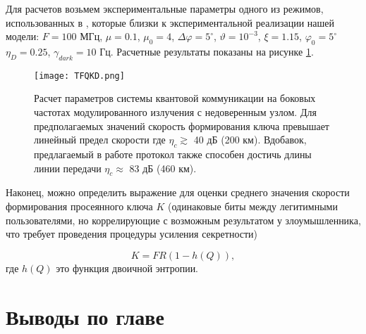 Для расчетов возьмем экспериментальные параметры одного из режимов, использованных в \cite{Gleim16,Miroshnichenko18}, которые близки к экспериментальной реализации нашей модели: $F=100$ МГц, $\mu=0.1$, $\mu_0=4$, $\Delta\varphi=5^{\circ}$, $\vartheta=10^{-3}$, $\xi=1.15$, $\varphi_0=5^{\circ}$ $\eta_D=0.25$, $\gamma_{dark}= 10$ Гц. Расчетные результаты показаны на рисунке \ref{fig:fig2}.

\begin{figure}
	\texttt{[image: TFQKD.png]}
	\caption{Расчет параметров системы квантовой коммуникации на боковых частотах модулированного излучения с недоверенным узлом. Для предполагаемых значений скорость формирования ключа превышает линейный предел скорости \cite{pirandola2017fundamental} где $\eta_c \gtrsim$ 40 дБ (200 км). Вдобавок, предлагаемый в работе протокол также способен достичь длины линии передачи $\eta_c\approx$ 83 дБ (460 км). }
	\label{fig:fig2}
\end{figure}


Наконец, можно определить выражение для оценки среднего значения скорости формирования просеянного ключа $K$ (одинаковые биты между легитимными пользователями, но коррелирующие с возможным результатом у злоумышленника, что требует проведения процедуры усиления секретности)

\begin{equation}
    K=FR(1-h(Q)),
\end{equation}
где $h(Q)$ это функция двоичной энтропии. 

\pagebreak

\section{Выводы по главе} \label{ch:ch6/sec3}




